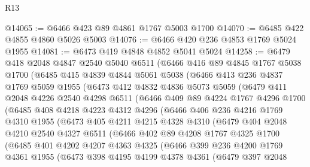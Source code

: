 \begin{lexlean}{R13}
\begin{coremodule}
@14065 := @6466 @423 @89 @4861 @1767 @5003 @1700
@14070 := @6485 @422 @4855 @4860 @5026 @5003
@14076 := @6466 @420 @236 @4853 @1769 @5024 @1955
@14081 := @6473 @419 @4848 @4852 @5041 @5024
@14258 := @6479
    @418
    @2048
    @4847
    @2540
    @5040
    @6511
    (@6466
      @416
      @89
      @4845
      @1767
      @5038
      @1700
      (@6485
        @415
        @4839
        @4844
        @5061
        @5038
        (@6466
          @413
          @236
          @4837
          @1769
          @5059
          @1955
          (@6473
            @412
            @4832
            @4836
            @5073
            @5059
            (@6479
              @411
              @2048
              @4226
              @2540
              @4298
              @6511
              (@6466
                @409
                @89
                @4224
                @1767
                @4296
                @1700
                (@6485
                  @408
                  @4218
                  @4223
                  @4312
                  @4296
                  (@6466
                    @406
                    @236
                    @4216
                    @1769
                    @4310
                    @1955
                    (@6473
                      @405
                      @4211
                      @4215
                      @4328
                      @4310
                      (@6479
                        @404
                        @2048
                        @4210
                        @2540
                        @4327
                        @6511
                        (@6466
                          @402
                          @89
                          @4208
                          @1767
                          @4325
                          @1700
                          (@6485
                            @401
                            @4202
                            @4207
                            @4363
                            @4325
                            (@6466
                              @399
                              @236
                              @4200
                              @1769
                              @4361
                              @1955
                              (@6473
                                @398
                                @4195
                                @4199
                                @4378
                                @4361
                                (@6479
                                  @397
                                  @2048

\end{coremodule}
\end{lexlean}

